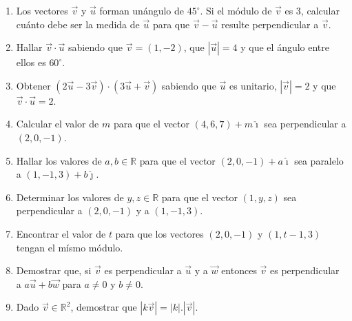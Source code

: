 \documentclass[a4paper]{article}
\newcommand{\degs}{^{\circ}}
\begin{document}
\begin{enumerate}
\begin{enumerate} [label=(\alph*)]
		\item Los vectores $\vec{v}$ y $\vec{u}$ forman unángulo de $45\degs$. Si el módulo de $\vec{v}$ es $3$, calcular cuánto debe ser la medida de $\vec{u}$ para que $\vec{v}-\vec{u}$ resulte perpendicular a $\vec{v}$.
		\item Hallar $\vec{v} \cdot \vec{u}$ sabiendo que $\vec{v}=(1,-2)$, que $|\vec{u}|=4$ y que el ángulo entre ellos es $60\degs$.
		\item Obtener $(2\vec{u}-3\vec{v})\cdot (3\vec{u}+\vec{v})$ sabiendo que $\vec{u}$ es unitario, $|\vec{v}|=2$ y que $\vec{v} \cdot \vec{u} = 2$.
		\item Calcular el valor de $m$ para que el vector $(4,6,7)+m\check{\imath}$ sea perpendicular a $(2,0,-1)$.
		\item Hallar los valores de $a,b \in\mathbb{R}$ para que el vector $(2,0,-1)+a\check{\imath}$ sea paralelo a $(1,-1,3)+b\check{\jmath}$.
		\item Determinar los valores de $y,z \in\mathbb{R}$ para que el vector $(1,y,z)$ sea perpendicular a $(2,0,-1)$ y a $(1,-1,3)$.
		\item Encontrar el valor de $t$ para que los vectores $(2,0,-1)$ y $(1,t-1,3)$ tengan el mísmo módulo.
		\item Demostrar que, si $\vec{v}$ es perpendicular a $\vec{u}$ y a $\vec{w}$ entonces $\vec{v}$ es perpendicular a $a\vec{u}+b\vec{w}$ para $a\neq0$ y $b\neq0$.
		\item Dado $\vec{v}\in \mathbb{R}^2$, demostrar que $|k\vec{v}|=|k|.|\vec{v}|$.
	\end{enumerate}
\end{enumerate}
\vspace{20pt} 
\end{document}
